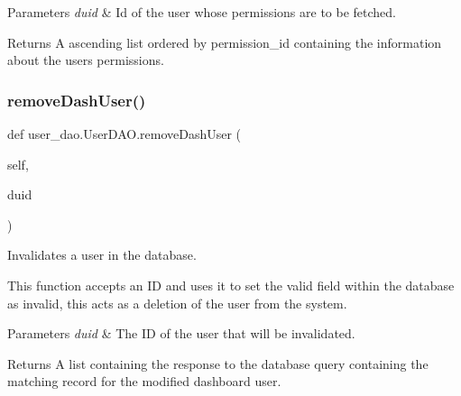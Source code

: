 \begin{DoxyParams}{Parameters}
{\em duid} & Id of the user whose permissions are to be fetched.\\
\hline
\end{DoxyParams}
\begin{DoxyReturn}{Returns}
A ascending list ordered by permission\+\_\+id containing the information about the user\textquotesingle{}s permissions. 
\end{DoxyReturn}
\mbox{\label{classuser__dao_1_1_user_d_a_o_a65e39578f477f0040bb63b6961195369}} 
\subsubsection{\texorpdfstring{remove\+Dash\+User()}{removeDashUser()}}
{\footnotesize\ttfamily def user\+\_\+dao.\+User\+D\+A\+O.\+remove\+Dash\+User (\begin{DoxyParamCaption}\item[{}]{self,  }\item[{}]{duid }\end{DoxyParamCaption})}



Invalidates a user in the database. 

This function accepts an ID and uses it to set the valid field within the database as invalid, this acts as a deletion of the user from the system.


\begin{DoxyParams}{Parameters}
{\em duid} & The ID of the user that will be invalidated.\\
\hline
\end{DoxyParams}
\begin{DoxyReturn}{Returns}
A list containing the response to the database query containing the matching record for the modified dashboard user. 
\end{DoxyReturn}
\mbox{\label{classuser__dao_1_1_user_d_a_o_a7d79a2de0559bfaa08ff71e2b5695d3f}} 

